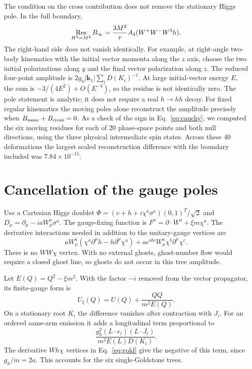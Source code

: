 \documentclass[11pt,a4paper]{article}
\newcommand{\bc}{B_{\infty}}
\begin{document}
The condition on the cross contribution does not remove the
stationary Higgs pole. In the full boundary,
\begin{equation}
 \mathop{\rm Res}_{H^2=M^2}\bc
    =\frac{3M^2}{v} A_4(W^+W^-W^3h).
 \label{eq:fixed-higgs-residue}
\end{equation}
The right-hand side does not vanish identically. For example, at
right-angle two-body kinematics with the initial vector momenta
along the \(z\) axis, choose the two initial polarizations along
\(y\) and the final vector polarization along \(z\). The reduced
four-point amplitude is \(2g_h|\boldsymbol{k}_1|
\sum_i D(K_i)^{-1}\). At large initial-vector energy \(E\),
the sum is \(-3/(4E^2)+O(E^{-4})\), so the residue is not identically
zero. The pole
statement is analytic; it does not require a real \(h\to hh\) decay.
For fixed regular kinematics the moving poles alone reconstruct
the amplitude precisely when \(B_{\rm same}+B_{\rm cross}=0\).
As a check of the sign in Eq.~\eqref{eq:cauchy}, we computed the six
moving residues for each of 20 phase-space points and both null
directions, using the three physical intermediate spin states.
Across these 40 deformations the largest scaled reconstruction
difference with the boundary included was \(7.84\times10^{-15}\).

\section{Cancellation of the gauge poles}
\label{sec:gauge}
Use a Cartesian Higgs doublet
\(\Phi=(v+h+i\chi^a\sigma^a)(0,1)^T/\sqrt 2\) and
\(D_\mu=\partial_\mu-iaW_\mu^a\sigma^a\).
The gauge-fixing function is
\(F^a=\partial\cdot W^a+\xi m\chi^a\).
The derivative interactions needed in addition to the unitary-gauge
vertices are
\begin{equation}
 aW_\mu^a(\chi^a\partial^\mu h-h\partial^\mu\chi^a)
 +a\epsilon^{abc}W_\mu^a\chi^b\partial^\mu\chi^c.
 \label{eq:gold}
\end{equation}
There is no \(WW\chi\) vertex. With no external ghosts, ghost-number
flow would require a closed ghost line, so ghosts do not occur
in this tree amplitude.

Let \(E(Q)=Q^2-\xi m^2\). With the factor \(-i\) removed from
the vector propagator, its finite-gauge form is
\begin{equation}
 U_\xi(Q)=U(Q)+\frac{QQ}{m^2 E(Q)}.
\end{equation}
On a stationary root \(K_i\) the difference vanishes after
contraction with \(J_i\). For an ordered same-arm emission it
adds a longitudinal term proportional to
\[
 \frac{g_h^2(L\cdot e_i)(L\cdot J_i)}{m^2 E(L)D(K_i)} .
\]
The derivative \(Wh\chi\) vertices in Eq.~\eqref{eq:gold} give
the negative of this term, since \(g_h/m=2a\).
This accounts for the six single-Goldstone trees.
\end{document}

